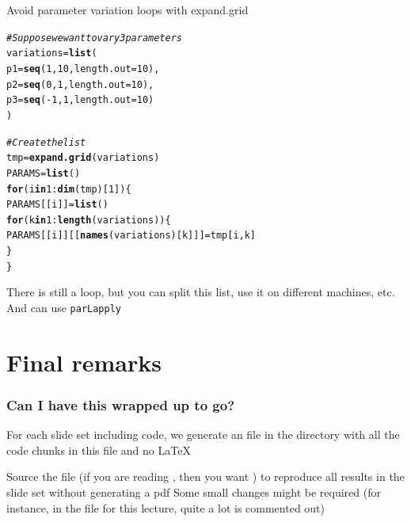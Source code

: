 \documentclass[aspectratio=169]{beamer}\usepackage[]{graphicx}\usepackage[]{xcolor}
\makeatletter
\newcommand{\hlnum}[1]{\textcolor[rgb]{0.686,0.059,0.569}{#1}}%
\newcommand{\hlcom}[1]{\textcolor[rgb]{0.678,0.584,0.686}{\textit{#1}}}%
\newcommand{\hlopt}[1]{\textcolor[rgb]{0,0,0}{#1}}%
\newcommand{\hldef}[1]{\textcolor[rgb]{0.345,0.345,0.345}{#1}}%
\newcommand{\hlkwa}[1]{\textcolor[rgb]{0.161,0.373,0.58}{\textbf{#1}}}%
\newcommand{\hlkwb}[1]{\textcolor[rgb]{0.69,0.353,0.396}{#1}}%
\newcommand{\hlkwc}[1]{\textcolor[rgb]{0.333,0.667,0.333}{#1}}%
\newcommand{\hlkwd}[1]{\textcolor[rgb]{0.737,0.353,0.396}{\textbf{#1}}}%
\newenvironment{kframe}{%
 \def\at@end@of@kframe{}%
 \ifinner\ifhmode%
  \def\at@end@of@kframe{\end{minipage}}%
  \begin{minipage}{\columnwidth}%
 \fi\fi%
 \def\FrameCommand##1{\hskip\@totalleftmargin \hskip-\fboxsep
 \colorbox{shadecolor}{##1}\hskip-\fboxsep
     \hskip-\linewidth \hskip-\@totalleftmargin \hskip\columnwidth}%
 \MakeFramed {\advance\hsize-\width
   \@totalleftmargin\z@ \linewidth\hsize
   \@setminipage}}%
 {\par\unskip\endMakeFramed%
 \at@end@of@kframe}
\newenvironment{knitrout}{}{} %
\makeatother
\begin{document}
\begin{frame}[fragile]{Avoid parameter variation loops with expand.grid}
\begin{knitrout}
\color{fgcolor}\begin{kframe}
\begin{alltt}
\hlcom{# Suppose we want to vary 3 parameters}
\hldef{variations} \hlkwb{=} \hlkwd{list}\hldef{(}
    \hlkwc{p1} \hldef{=} \hlkwd{seq}\hldef{(}\hlnum{1}\hldef{,} \hlnum{10}\hldef{,} \hlkwc{length.out} \hldef{=} \hlnum{10}\hldef{),}
    \hlkwc{p2} \hldef{=} \hlkwd{seq}\hldef{(}\hlnum{0}\hldef{,} \hlnum{1}\hldef{,} \hlkwc{length.out} \hldef{=} \hlnum{10}\hldef{),}
    \hlkwc{p3} \hldef{=} \hlkwd{seq}\hldef{(}\hlopt{-}\hlnum{1}\hldef{,} \hlnum{1}\hldef{,} \hlkwc{length.out} \hldef{=} \hlnum{10}\hldef{)}
\hldef{)}

\hlcom{# Create the list}
\hldef{tmp} \hlkwb{=} \hlkwd{expand.grid}\hldef{(variations)}
\hldef{PARAMS} \hlkwb{=} \hlkwd{list}\hldef{()}
\hlkwa{for} \hldef{(i} \hlkwa{in} \hlnum{1}\hlopt{:}\hlkwd{dim}\hldef{(tmp)[}\hlnum{1}\hldef{]) \{}
    \hldef{PARAMS[[i]]} \hlkwb{=} \hlkwd{list}\hldef{()}
    \hlkwa{for} \hldef{(k} \hlkwa{in} \hlnum{1}\hlopt{:}\hlkwd{length}\hldef{(variations)) \{}
        \hldef{PARAMS[[i]][[}\hlkwd{names}\hldef{(variations)[k]]]} \hlkwb{=} \hldef{tmp[i, k]}
    \hldef{\}}
\hldef{\}}
\end{alltt}
\end{kframe}
\end{knitrout}

There is still a loop, but you can split this list, use it on different machines, etc. And can use \texttt{parLapply}
\end{frame}


\section*{Final remarks}
\begin{frame}\frametitle{Can I have this wrapped up to go?}
For each slide set including  code, we generate an  file in the  directory with all the code chunks in this  file and no \LaTeX
\vfill

Source the file (if you are reading , then you want ) to reproduce all results in the slide set without generating a pdf
\vfill
Some small changes might be required (for instance, in the file for this lecture, quite a lot is commented out)
\end{frame}





\end{document}
